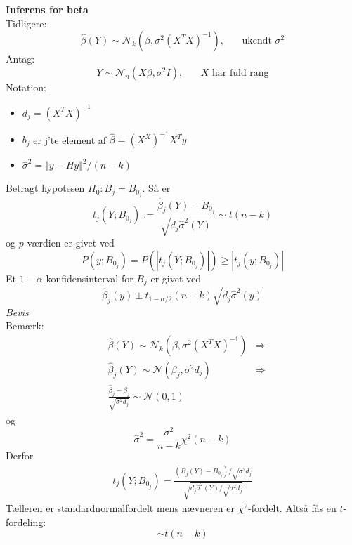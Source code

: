 \documentclass[12pt,a4paper]{report}
\author{Frederik Appel Vardinghus-Nielsen}
\begin{document}
\noindent\textbf{Inferens for beta}\\
Tidligere:
\begin{equation*}
\hat{\beta}(Y)\sim\mathcal{N}_k(\beta,\sigma^2(X^TX)^{-1}),\phantom{mm}\text{ukendt }\sigma^2
\end{equation*}
Antag:
\begin{equation*}
Y\sim\mathcal{N}_n(X\beta,\sigma^2I),\phantom{mm}X\text{ har fuld rang}
\end{equation*}
Notation:
\begin{itemize}
\item $d_j=(X^TX)^{-1}$
\item $b_j$ er j'te element af $\hat{\beta}=(X^X)^{-1}X^Ty$
\item $\hat{\sigma}^2=\Vert y-Hy\Vert^2/(n-k)$
\end{itemize}
Betragt hypotesen $H_0:B_j=B_{0_j}$. Så er
\begin{equation*}
t_j(Y;B_{0_j}):=\frac{\hat{\beta}_j(Y)-B_{0_j}}{\sqrt{d_j\hat{\sigma}^2(Y)}}\sim t(n-k)
\end{equation*}
og $p$-værdien er givet ved
\begin{equation*}
P(y;B_{0_j})=P(|t_j(Y;B_{0_j})|)\geq |t_j(y;B_{0_j})|
\end{equation*}
Et $1-\alpha$-konfidensinterval for $B_j$ er givet ved 
\begin{equation*}
\hat{\beta}_j(y)\pm t_{1-\alpha/2}(n-k)\sqrt{d_j\hat{\sigma}^2(y)}
\end{equation*}
\textit{Bevis}\\
Bemærk:
\begin{align*}
&\hat{\beta}(Y)\sim\mathcal{N}_k(\beta,\sigma^2(X^TX)^{-1})&\Rightarrow\\
&\hat{\beta}_j(Y)\sim\mathcal{N}(\beta_j,\sigma^2d_j)&\Rightarrow\\
&\frac{\hat{\beta}_j-\beta_j}{\sqrt{\sigma^2d_j}}\sim\mathcal{N}(0,1)
\end{align*}
og
\begin{equation*}
\hat{\sigma}^2=\frac{\sigma^2}{n-k}\chi^2(n-k)
\end{equation*}
Derfor
\begin{align*}
t_j(Y;B_{0_j})=\frac{(B_j(Y)-B_{0_j})/\sqrt{\sigma^2d_j}}{\sqrt{d_j\hat{\sigma}^2(Y)/\sqrt{\sigma^2d_j}}}
\end{align*}
Tælleren er standardnormalfordelt mens nævneren er $\chi^2$-fordelt. Altså fås en $t$-fordeling:
\begin{equation*}
\sim t(n-k)
\end{equation*}
\end{document}

